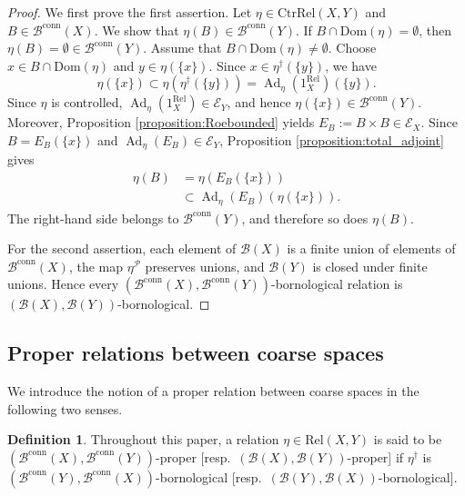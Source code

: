 \documentclass[12pt, a4paper]{amsart}
\theoremstyle{definition}
\newtheorem{definition}[theorem]{Definition}
\newcommand{\Ad}{\mathop{\mathrm{Ad}}\nolimits}
\newcommand{\Rel}{\mathrm{Rel}}
\newcommand{\CtrRel}{\mathrm{CtrRel}}
\newcommand{\Dom}{\mathrm{Dom}}
\begin{document}
\begin{proof}
We first prove the first assertion. Let $\eta \in \CtrRel(X,Y)$ and $B \in \mathcal{B}^{\mathrm{conn}}(X)$. We show that $\eta(B) \in \mathcal{B}^{\mathrm{conn}}(Y)$. If $B \cap \Dom(\eta) = \emptyset$, then $\eta(B) = \emptyset \in \mathcal{B}^{\mathrm{conn}}(Y)$. Assume that $B \cap \Dom(\eta) \neq \emptyset$. Choose $x \in B \cap \Dom(\eta)$ and $y \in \eta(\{x\})$. Since $x \in \eta^\dagger(\{y\})$, we have
\[
\eta(\{x\}) \subset \eta(\eta^\dagger(\{y\})) = \Ad_\eta(1^\Rel_X)(\{y\}).
\]
Since $\eta$ is controlled, $\Ad_\eta(1^\Rel_X) \in \mathcal{E}_Y$, and hence $\eta(\{x\}) \in \mathcal{B}^{\mathrm{conn}}(Y)$. Moreover, Proposition \ref{proposition:Roebounded} yields $E_B := B \times B \in \mathcal{E}_X$. Since $B = E_B(\{x\})$ and $\Ad_\eta(E_B) \in \mathcal{E}_Y$, Proposition \ref{proposition:total_adjoint} gives
\begin{align*}
\eta(B)
&= \eta(E_B(\{x\})) \\
&\subset \Ad_\eta(E_B)(\eta(\{x\})).
\end{align*}
The right-hand side belongs to $\mathcal{B}^{\mathrm{conn}}(Y)$, and therefore so does $\eta(B)$.

For the second assertion, each element of $\mathcal{B}(X)$ is a finite union of elements of $\mathcal{B}^{\mathrm{conn}}(X)$, the map $\eta^{\mathcal{P}}$ preserves unions, and $\mathcal{B}(Y)$ is closed under finite unions. Hence every $(\mathcal{B}^{\mathrm{conn}}(X),\mathcal{B}^{\mathrm{conn}}(Y))$-bornological relation is $(\mathcal{B}(X),\mathcal{B}(Y))$-bornological.
\end{proof}


\subsection{Proper relations between coarse spaces}

We introduce the notion of a proper relation between coarse spaces in the following two senses.

\begin{definition}\label{definition:proper}
Throughout this paper, a relation $\eta \in \Rel(X,Y)$ is said to be $(\mathcal{B}^{\mathrm{conn}}(X),\mathcal{B}^{\mathrm{conn}}(Y))$-proper [resp.~$(\mathcal{B}(X),\mathcal{B}(Y))$-proper] if $\eta^\dagger$ is $(\mathcal{B}^{\mathrm{conn}}(Y),\mathcal{B}^{\mathrm{conn}}(X))$-bornological [resp.~$(\mathcal{B}(Y),\mathcal{B}(X))$-bornological].
\end{definition}
\end{document}
